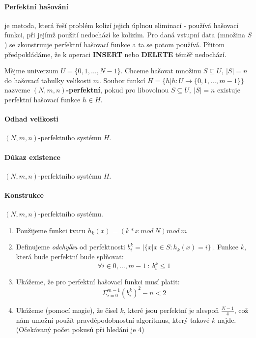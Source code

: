 \documentclass[a4paper]{article}      %
\newenvironment{definition}[1][Definice]{\begin{trivlist}
\item[\hskip \labelsep {\bfseries #1}]}{\end{trivlist}}
\begin{document}
\paragraph{Perfektní hašování} je metoda, která řeší problém kolizí jejich úplnou eliminací - používá hašovací funkci, při jejímž použití nedochází ke kolizím. Pro daná vstupní data (množina $S$) se zkonstruuje perfektní hašovací funkce a ta se potom používá.
Přitom předpokládáme, že k operaci \textbf{INSERT} nebo \textbf{DELETE} téměř nedochází.

\begin{definition}
Mějme univerzum $U = \lbrace 0,1,\ldots, N-1 \rbrace$. Chceme hašovat množinu $S \subseteq U,\ |S|=n$ do hašovací tabulky velikosti $m$.
Soubor funkcí $H = \lbrace h | h: U \rightarrow \lbrace 0,1,\ldots, m-1 \rbrace \rbrace$ nazveme \textbf{$(N,m,n)$-perfektní}, pokud pro libovolnou $S \subseteq U,\ |S|=n$ existuje perfektní hašovací funkce $h \in H$.
\end{definition}

\paragraph{Odhad velikosti} $(N,m,n)$-perfektního systému $H$.

\paragraph{Důkaz existence} $(N,m,n)$-perfektního systému $H$.

\paragraph{Konstrukce} $(N,m,n)$-perfektního systému.
\begin{enumerate}
\item Použijeme funkci tvaru $h_{k}(x) = (k*x\ mod\ N) mod\ m$
\item Definujeme \emph{odchylku} od perfektnosti $b_{i}^{k} = |\lbrace x | x \in S: h_{k}(x) = i \rbrace|$.
Funkce $k$, která bude perfektní bude splňovat:
\[
\forall i \in 0,\ldots,m-1\ :\ b_{i}^{k} \leq 1
\]
\item Ukážeme, že pro perfektní hašovací funkci musí platit:
\[
\Sigma_{i=0}^{m-1} (b_{i}^{k})^{2} - n < 2
\]
\item Ukážeme (pomocí magie), že čísel $k$, které jsou perfektní je alespoň $\frac{N-1}{4}$, což nám umožní použít pravděpodobnostní algoritmus, který takové $k$ najde. (Očekávaný počet pokusů při hledání je 4)
\end{enumerate}
\end{document}
